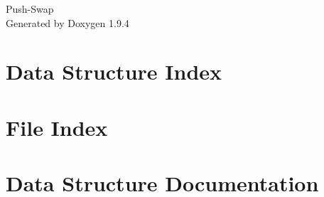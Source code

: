 \documentclass[twoside]{book}
\newcommand{\+}{\discretionary{\mbox{\scriptsize$\hookleftarrow$}}{}{}}
\newcommand{\clearemptydoublepage}{%
    \newpage{\pagestyle{empty}\cleardoublepage}%
  }
\begin{document}
  \raggedbottom
    \hypersetup{pageanchor=false,
                bookmarksnumbered=true,
                pdfencoding=unicode
               }
  \begin{titlepage}
  \vspace*{7cm}
  \begin{center}%
  {\Large Push-\/\+Swap}\\
  \vspace*{1cm}
  {\large Generated by Doxygen 1.9.4}\\
  \end{center}
  \end{titlepage}
  \clearemptydoublepage
  \tableofcontents
  \clearemptydoublepage
  \hypersetup{pageanchor=true}
\chapter{Data Structure Index}

\chapter{File Index}

\chapter{Data Structure Documentation}



\end{document}
